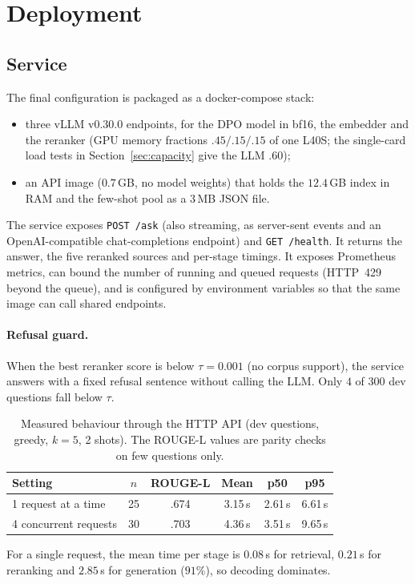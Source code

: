 \documentclass[11pt,a4paper]{article}
\newcommand{\rl}{ROUGE-L}
\begin{document}
\section{Deployment}\label{sec:deploy}
\subsection{Service}
The final configuration is packaged as a docker-compose stack:
\begin{itemize}[leftmargin=*]
\item three vLLM v0.30.0 endpoints, for the DPO model in bf16, the embedder and the reranker (GPU memory fractions $.45/.15/.15$ of one L40S; the single-card load tests in Section~\ref{sec:capacity} give the LLM $.60$);
\item an API image ($0.7$\,GB, no model weights) that holds the $12.4$\,GB index in RAM and the few-shot pool as a $3$\,MB JSON file.
\end{itemize}
The service exposes \texttt{POST /ask} (also streaming, as server-sent events and an OpenAI-compatible chat-completions endpoint) and \texttt{GET /health}. It returns the answer, the five reranked sources and per-stage timings. It exposes Prometheus metrics, can bound the number of running and queued requests (HTTP~429 beyond the queue), and is configured by environment variables so that the same image can call shared endpoints.

\paragraph{Refusal guard.} When the best reranker score is below $\tau{=}0.001$ (no corpus support), the service answers with a fixed refusal sentence without calling the LLM. Only $4$ of $300$ dev questions fall below $\tau$.

\begin{table}[H]
\centering
\caption{Measured behaviour through the HTTP API (dev questions, greedy, $k{=}5$, 2 shots). The \rl{} values are parity checks on few questions only.}\label{tab:lat}
\begin{tabular}{@{}lccccc@{}}
\toprule
Setting & $n$ & \rl{} & Mean & p50 & p95\\
\midrule
1 request at a time & 25 & .674 & 3.15\,s & 2.61\,s & 6.61\,s\\
4 concurrent requests & 30 & .703 & 4.36\,s & 3.51\,s & 9.65\,s\\
\bottomrule
\end{tabular}
\end{table}
For a single request, the mean time per stage is $0.08$\,s for retrieval, $0.21$\,s for reranking and $2.85$\,s for generation ($91\%$), so decoding dominates.
\end{document}
